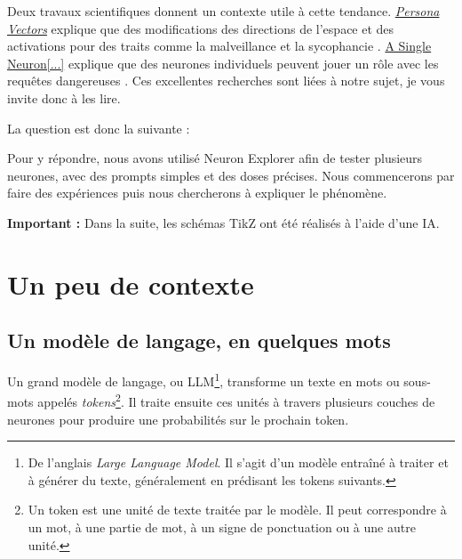 \documentclass[11pt,a4paper]{article}
\begin{document}
Deux travaux scientifiques donnent un contexte utile à cette tendance. \href{https://arxiv.org/abs/2507.21509}{\emph{Persona Vectors}} explique que des modifications des directions de l'espace et des activations pour des traits comme la malveillance et la sycophancie \cite{chen2025}. \href{https://arxiv.org/abs/2605.08513}{A Single Neuron[...]} explique que des neurones individuels peuvent jouer un rôle avec les requêtes dangereuses \cite{kazemi2026}. Ces excellentes recherches sont liées à notre sujet, je vous invite donc à les lire.

La question est donc la suivante :

\begin{center}
\end{center}

Pour y répondre, nous avons utilisé Neuron Explorer afin de tester plusieurs neurones, avec des prompts simples et des doses précises. Nous commencerons par faire des expériences puis nous chercherons à expliquer le phénomène.

\vspace{0.4cm}

\textbf{Important :} Dans la suite, les schémas TikZ ont été réalisés à l’aide d’une IA.

\section{Un peu de contexte}

\subsection{Un modèle de langage, en quelques mots}

Un grand modèle de langage, ou LLM\footnote{De l'anglais \emph{Large Language Model}. Il s'agit d'un modèle entraîné à traiter et à générer du texte, généralement en prédisant les tokens suivants.}, transforme un texte en mots ou sous-mots appelés \emph{tokens}\footnote{Un token est une unité de texte traitée par le modèle. Il peut correspondre à un mot, à une partie de mot, à un signe de ponctuation ou à une autre unité.}. Il traite ensuite ces unités à travers plusieurs couches de neurones pour produire une probabilités sur le prochain token.
\end{document}
